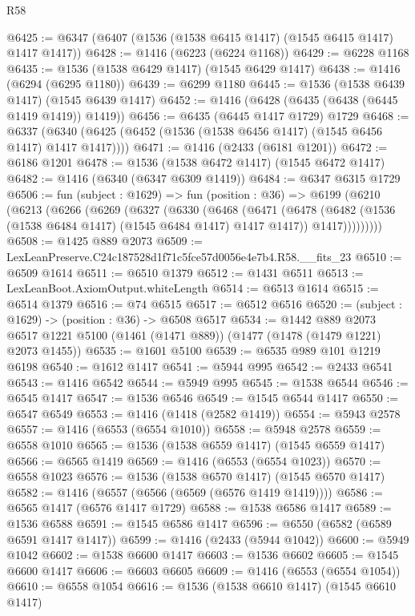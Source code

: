 \begin{lexlean}{R58}
\begin{coremodule}
{{@6425 := @6347 (@6407 (@1536 (@1538 @6415 @1417) (@1545 @6415 @1417) @1417 @1417))
@6428 := @1416 (@6223 (@6224 @1168))
@6429 := @6228 @1168
@6435 := @1536 (@1538 @6429 @1417) (@1545 @6429 @1417)
@6438 := @1416 (@6294 (@6295 @1180))
@6439 := @6299 @1180
@6445 := @1536 (@1538 @6439 @1417) (@1545 @6439 @1417)
@6452 := @1416 (@6428 (@6435 (@6438 (@6445 @1419 @1419)) @1419))
@6456 := @6435 (@6445 @1417 @1729) @1729
@6468 := @6337 (@6340 (@6425 (@6452 (@1536 (@1538 @6456 @1417) (@1545 @6456 @1417) @1417 @1417))))
@6471 := @1416 (@2433 (@6181 @1201))
@6472 := @6186 @1201
@6478 := @1536 (@1538 @6472 @1417) (@1545 @6472 @1417)
@6482 := @1416 (@6340 (@6347 @6309 @1419))
@6484 := @6347 @6315 @1729
@6506 := fun (subject : @1629) =>
  fun (position : @36) =>
  @6199
    (@6210
      (@6213
        (@6266
          (@6269
            (@6327
              (@6330
                (@6468
                  (@6471
                    (@6478
                      (@6482 (@1536 (@1538 @6484 @1417) (@1545 @6484 @1417) @1417 @1417))
                      @1417)))))))))
@6508 := @1425 @889 @2073
@6509 := LexLeanPreserve.C24c187528d1f71c5fce57d0056e4e7b4.R58.__fits_23
@6510 := @6509 @1614
@6511 := @6510 @1379
@6512 := @1431 @6511
@6513 := LexLeanBoot.AxiomOutput.whiteLength
@6514 := @6513 @1614
@6515 := @6514 @1379
@6516 := @74 @6515
@6517 := @6512 @6516
@6520 := (subject : @1629) -> (position : @36) -> @6508 @6517
@6534 := @1442
    @889
    @2073
    @6517
    @1221
    @5100
    (@1461 (@1471 @889))
    (@1477 (@1478 (@1479 @1221) @2073 @1455))
@6535 := @1601 @5100
@6539 := @6535 @989 @101 @1219 @6198
@6540 := @1612 @1417
@6541 := @5944 @995
@6542 := @2433 @6541
@6543 := @1416 @6542
@6544 := @5949 @995
@6545 := @1538 @6544
@6546 := @6545 @1417
@6547 := @1536 @6546
@6549 := @1545 @6544 @1417
@6550 := @6547 @6549
@6553 := @1416 (@1418 (@2582 @1419))
@6554 := @5943 @2578
@6557 := @1416 (@6553 (@6554 @1010))
@6558 := @5948 @2578
@6559 := @6558 @1010
@6565 := @1536 (@1538 @6559 @1417) (@1545 @6559 @1417)
@6566 := @6565 @1419
@6569 := @1416 (@6553 (@6554 @1023))
@6570 := @6558 @1023
@6576 := @1536 (@1538 @6570 @1417) (@1545 @6570 @1417)
@6582 := @1416 (@6557 (@6566 (@6569 (@6576 @1419 @1419))))
@6586 := @6565 @1417 (@6576 @1417 @1729)
@6588 := @1538 @6586 @1417
@6589 := @1536 @6588
@6591 := @1545 @6586 @1417
@6596 := @6550 (@6582 (@6589 @6591 @1417 @1417))
@6599 := @1416 (@2433 (@5944 @1042))
@6600 := @5949 @1042
@6602 := @1538 @6600 @1417
@6603 := @1536 @6602
@6605 := @1545 @6600 @1417
@6606 := @6603 @6605
@6609 := @1416 (@6553 (@6554 @1054))
@6610 := @6558 @1054
@6616 := @1536 (@1538 @6610 @1417) (@1545 @6610 @1417)
}}
\end{coremodule}
\end{lexlean}
